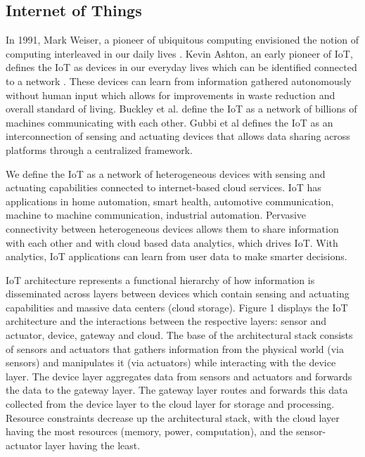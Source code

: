 \documentclass[conference]{IEEEtran}
\begin{document}
\subsection{Internet of Things}

In 1991, Mark Weiser, a pioneer of ubiquitous computing envisioned the notion of computing interleaved in our daily lives \cite{weiser1991}. Kevin Ashton, an early pioneer of IoT, defines the IoT as devices in our everyday lives which can be identified connected to a network \cite{ashton2009internet}. These devices can learn from information gathered autonomously without human input which allows for improvements in waste reduction and overall standard of living. Buckley et al. \cite{yan2008internet} define the IoT as a network of billions of machines communicating with each other. Gubbi et al \cite{gubbi_internet_2013} defines the IoT as an interconnection of sensing and actuating
devices that allows data sharing across platforms through a centralized framework. 

\par We define the IoT as a network of heterogeneous devices with sensing and actuating capabilities connected to internet-based cloud services. IoT has applications in home automation, smart health, automotive communication, machine to machine communication, industrial automation. Pervasive connectivity between heterogeneous devices allows them to share information with each other and with cloud based data analytics, which drives IoT. With analytics, IoT applications can learn from user data
to make smarter decisions. 



\par  IoT architecture represents a functional hierarchy of how information is disseminated across layers between devices which contain sensing and
actuating capabilities and massive data centers (cloud storage). Figure 1 displays the IoT architecture and the interactions between the respective
layers: sensor and actuator, device, gateway and cloud. The base of the architectural stack consists of sensors and actuators that gathers information from the physical world (via sensors) and manipulates it (via actuators) while interacting with the device layer. The device layer aggregates data from sensors and actuators and forwards the data to the gateway layer. The gateway layer routes and forwards this data collected from the
device layer to the cloud layer for storage and processing. Resource constraints decrease up the architectural stack, with
the cloud layer having the most resources (memory, power, computation), and the sensor-
actuator layer having the least. 
\end{document}

